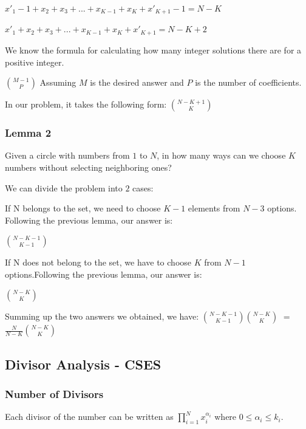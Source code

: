                
                $x'_1 - 1 + x_2 + x_3 + ... + x_{\scriptscriptstyle K-1} + x_{\scriptscriptstyle K} + x'_{\scriptscriptstyle K+1}-1 = N-K$
        
                $x'_1 + x_2 + x_3 + ... + x_{\scriptscriptstyle K-1} + x_{\scriptscriptstyle K} + x'_{\scriptscriptstyle K+1} = N - K + 2$
        
                
                We know the formula for calculating how many integer solutions there are for a positive integer.
        
                $\binom{M-1}{P}$ Assuming $M$ is the desired answer and $P$ is the number of coefficients.
        
                In our problem, it takes the following form: $\binom{N-K+1}{K}$
    
            \subsubsection{Lemma 2}
            Given a circle with numbers from $1$ to $N$, in how many ways can we choose $K$ numbers without selecting neighboring ones?

            We can divide the problem into $2$ cases:

            If N belongs to the set, we need to choose $K-1$ elements from $N-3$ options. Following the previous lemma, our answer is:
            
            $\binom{N-K-1}{K-1}$
            
            
            If N does not belong to the set, we have to choose $K$ from $N-1$ options.Following the previous lemma, our answer is:
            
            $\binom{N-K}{K}$

            
            Summing up the two answers we obtained, we have:  $\binom{N-K-1}{K-1}\binom{N-K}{K}$ $=$ $\frac{N}{N-K}\binom{N-K}{K}$
        \subsection{Divisor Analysis - CSES} 
            \subsubsection{Number of Divisors}
                    Each divisor of the number can be written as $\prod_{i = 1}^N x_i^{\alpha_i}$
                    where $0 \leq \alpha_i \leq k_i$.
                    
